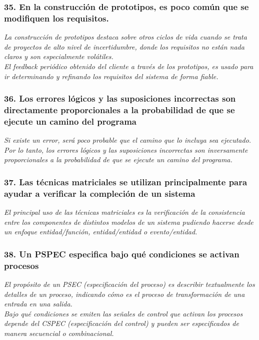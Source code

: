 \subsubsection*{35. En la construcción de prototipos, es poco común que se modifiquen los requisitos.}
\textit{La construcción de prototipos destaca sobre otros ciclos de vida cuando se trata de proyectos de alto nivel de incertidumbre, donde los requisitos no están nada claros y son especialmente volátiles.\\
    El feedback periódico obtenido del cliente a través de los prototipos, es usado para ir determinando y refinando los requisitos del sistema de forma fiable.}

\subsubsection*{36. Los errores lógicos y las suposiciones incorrectas son directamente proporcionales a la probabilidad de que se ejecute un camino del programa}
\textit{Si existe un error, será poco probable que el camino que lo incluya sea ejecutado. Por lo tanto, los errores lógicos y las suposiciones incorrectas son inversamente proporcionales a la probabilidad de que se ejecute un camino del programa.
}

\subsubsection*{37. Las técnicas matriciales se utilizan principalmente para ayudar a verificar la compleción de un sistema}
\textit{El principal uso de las técnicas matriciales es la verificación de la consistencia entre los componentes de distintos modelos de un sistema pudiendo hacerse desde un enfoque entidad/función, entidad/entidad o evento/entidad.
}

\subsubsection*{38. Un PSPEC especifica bajo qué condiciones se activan procesos}
\textit{El propósito de un PSEC (especificación del proceso) es describir textualmente los detalles de un proceso, indicando cómo es el proceso de transformación de una entrada en una salida.
    \\
    Bajo qué condiciones se emiten las señales de control que activan los procesos depende del CSPEC (especificación del control) y pueden ser especificados de manera secuencial o combinacional.
}

